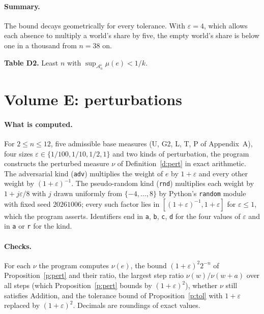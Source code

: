 \documentclass{situationist-preprint}
\begin{document}
\paragraph{Summary.} The bound decays geometrically for every tolerance. With $\varepsilon = 4$, which allows each absence to multiply a world's share by five, the empty world's share is below one in a thousand from $n = 38$ on.



\begin{center}
\textbf{Table D2.} Least $n$ with $\sup_{\mathcal{A}_n^\varepsilon} \mu(e) < 1/k$.\\[0.5em]

\end{center}

\section{Volume E: perturbations}\label{app:e}

\paragraph{What is computed.} For $2 \leq n \leq 12$, five admissible base measures (U, G2, L, T, P of Appendix~A), four sizes $\varepsilon \in \{1/100, 1/10, 1/2, 1\}$ and two kinds of perturbation, the program constructs the perturbed measure $\nu$ of Definition~\ref{d:pert} in exact arithmetic. The adversarial kind (\texttt{adv}) multiplies the weight of $e$ by $1 + \varepsilon$ and every other weight by $(1+\varepsilon)^{-1}$. The pseudo-random kind (\texttt{rnd}) multiplies each weight by $1 + j\varepsilon/8$ with $j$ drawn uniformly from $\{-4, \ldots, 8\}$ by Python's \texttt{random} module with fixed seed $20261006$; every such factor lies in $[(1+\varepsilon)^{-1}, 1+\varepsilon]$ for $\varepsilon \leq 1$, which the program asserts. Identifiers end in \texttt{a}, \texttt{b}, \texttt{c}, \texttt{d} for the four values of $\varepsilon$ and in \texttt{a} or \texttt{r} for the kind.

\paragraph{Checks.} For each $\nu$ the program computes $\nu(e)$, the bound $(1+\varepsilon)^2 2^{-n}$ of Proposition~\ref{p:pert} and their ratio, the largest step ratio $\nu(w)/\nu(w+a)$ over all steps (which Proposition~\ref{p:pert} bounds by $(1+\varepsilon)^2$), whether $\nu$ still satisfies Addition, and the tolerance bound of Proposition~\ref{p:tol} with $1 + \varepsilon$ replaced by $(1+\varepsilon)^2$. Decimals are roundings of exact values.
\end{document}

